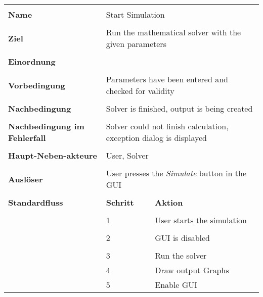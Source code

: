 {\begin{tabular}{|p{5cm}|p{2cm}|p{3cm}|}
\hline \\
\textbf{Name} & \multicolumn{2}{p{5cm}|}{Start Simulation} \\
\hline \\
\textbf{Ziel} & \multicolumn{2}{p{5cm}|}{Run the mathematical solver with the given parameters} \\
\hline \\
\textbf{Einordnung} & \multicolumn{2}{p{5cm}|}{} \\
\hline \\
\textbf{Vorbedingung} & \multicolumn{2}{p{5cm}|}{Parameters have been entered and checked for validity} \\
\hline \\
\textbf{Nachbedingung} & \multicolumn{2}{p{5cm}|}{Solver is finished, output is being created} \\
\hline \\
\textbf{Nachbedingung im Fehlerfall} & \multicolumn{2}{p{5cm}|}{Solver could not finish calculation, exception dialog is displayed}\\
\hline \\
\textbf{Haupt-Neben-akteure} & \multicolumn{2}{p{5cm}|}{User, Solver} \\
\hline \\
\textbf{Ausl\"oser} & \multicolumn{2}{p{5cm}|}{User presses the \textit{Simulate} button in the GUI} \\
\hline \\
\textbf{Standardfluss} & \textbf{Schritt}& \textbf{Aktion} \\
\hline \\
& 1 & User starts the simulation\\
\hline \\
& 2 & GUI is disabled \\
\hline \\
& 3 & Run the solver\\
\hline
& 4 & Draw output Graphs\\
\hline
& 5 & Enable GUI\\
\hline
\end{tabular}

}
